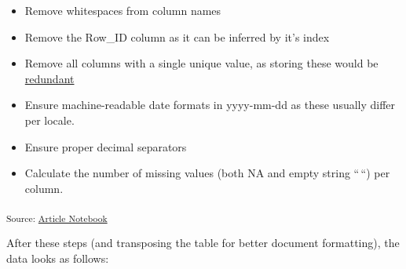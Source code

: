 \documentclass[
  letterpaper,
  DIV=11,
  numbers=noendperiod,
  oneside]{scrartcl}
\providecommand{\tightlist}{%
  \setlength{\itemsep}{0pt}\setlength{\parskip}{0pt}}\usepackage{longtable,booktabs,array}
\begin{document}
\begin{itemize}
\tightlist
\item
  Remove whitespaces from column names
\item
  Remove the Row\_ID column as it can be inferred by it's index
\item
  Remove all columns with a single unique value, as storing these would
  be
  \href{https://few.vu.nl/~molenaar/courses/StatR/chapters/B-06-raw_data.html}{redundant}
\item
  Ensure machine-readable date formats in yyyy-mm-dd as these usually
  differ per locale.
\item
  Ensure proper decimal separators
\item
  Calculate the number of missing values (both NA and empty string
  ``\,``) per column.
\end{itemize}

\textsubscript{Source:
\href{https://SJbrou.github.io/Supply_Chain_Data_Analysis/index.qmd.html}{Article
Notebook}}

After these steps (and transposing the table for better document
formatting), the data looks as follows:
\end{document}
